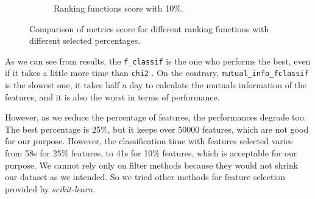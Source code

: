 \begin{figure}[]
\begin{subfigure}[t]{.8\textwidth}
		\caption{Ranking functions score with 10\%.}\label{fig:ranking10}
	\end{subfigure}
	\caption{Comparison of metrics score for different ranking functions with different selected percentages.}\label{fig:ranking}
\end{figure}

As we can see from results, the \texttt{f\_classif} is the one who performs the best, even if it takes a little more time than \texttt{chi2} . On the contrary, \texttt{mutual\_info\_fclassif} is the slowest one, it takes half a day to calculate the mutuals information of the features, and it is also the worst in terms of performance.

However, as we reduce the percentage of features, the performances degrade too. The best percentage is 25\%, but it keeps over 50000 features, which are not good for our purpose. However, the classification time with features selected varies from 58s for 25\% features, to 41s for 10\% features, which is acceptable for our purpose. 
We cannot rely only on filter methods because they would not shrink our dataset as we intended. So we tried other methods for feature selection provided by \textit{scikit-learn}.




